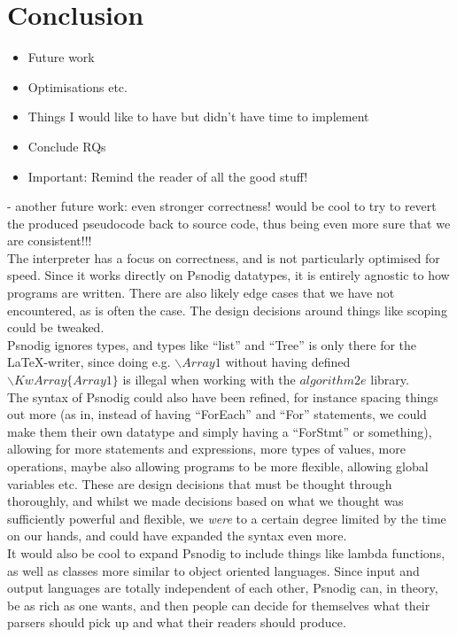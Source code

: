 \chapter{Conclusion}
\begin{itemize}
    \item Future work
    \item Optimisations etc.
    \item Things I would like to have but didn't have time to implement
    \item Conclude RQs
    \item Important: Remind the reader of all the good stuff!
\end{itemize}

- another future work: even stronger correctness! would be cool to try to revert the produced pseudocode back to source code, thus being even more sure that we are consistent!!! \\

The interpreter has a focus on correctness, and is not particularly optimised for speed. Since it works directly on Psnodig datatypes, it is entirely agnostic to how programs are written. There are also likely edge cases that we have not encountered, as is often the case. The design decisions around things like scoping could be tweaked. \hfill \\

Psnodig ignores types, and types like ``list'' and ``Tree'' is only there for the \LaTeX-writer, since doing e.g. $\backslash Array1$ without having defined $\backslash KwArray\{Array1\}$ is illegal when working with the $algorithm2e$ library. \hfill \\

The syntax of Psnodig could also have been refined, for instance spacing things out more (as in, instead of having ``ForEach'' and ``For'' statements, we could make them their own datatype and simply having a ``ForStmt'' or something), allowing for more statements and expressions, more types of values, more operations, maybe also allowing programs to be more flexible, allowing global variables etc. These are design decisions that must be thought through thoroughly, and whilst we made decisions based on what we thought was sufficiently powerful and flexible, we \textit{were} to a certain degree limited by the time on our hands, and could have expanded the syntax even more. \hfill \\

It would also be cool to expand Psnodig to include things like lambda functions, as well as classes more similar to object oriented languages. Since input and output languages are totally independent of each other, Psnodig can, in theory, be as rich as one wants, and then people can decide for themselves what their parsers should pick up and what their readers should produce. \hfill \\

